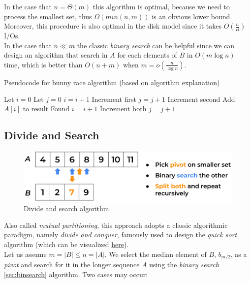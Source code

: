 In the case that $n=\Theta (m)$ this algorithm is optimal, because we need to process the smallest set, thus $\Omega(min(n,m))$ is an obvious lower bound. Moreover, this procedure is also optimal in the disk model since it takes $O \left(\frac{n}{B}\right)$ I/Os. \\
In the case that $n \ll m$ the classic \textit{binary search} can be helpful since we can design an algorithm that search in $A$ for each elements of $B$ in $O(m \log n)$ time, which is better than $O(n+m)$ when $m=o\left(\frac{n}{\log n}\right)$.

\begin{algorithm}
    \captionsetup{labelsep=newline}
    \caption{Pseudocode for bunny race algorithm \label{alg:bunnyrace} (based on algorithm explanation)}
    \begin{algorithmic}[1]
        \State Let $i=0$ 
        \State Let $j=0$ 
                \State $i=i+1$ \Comment Increment first
                \State $j=j+1$ \Comment Increment second
            \Else
                \State Add $A[i]$ to result \Comment Found
                \State $i=i+1$  \Comment Increment both
                \State $j=j+1$
            \EndIf
        \EndWhile
    \end{algorithmic}
\end{algorithm}

\subsection{Divide and Search \label{sec:divandsearch}}

\begin{figure}[H] 
    \begin{center}
        \includegraphics[width=.8\textwidth]{imgs/divide_and_search.png}
        \caption{Divide and search algorithm \label{fig:divandsearch}}
    \end{center}
\end{figure}

Also called \textit{mutual partitioning}, this approach adopts a classic algorithmic paradigm, namely \textit{divide and conquer}, famously used to design the \textit{quick sort} algorithm (which can be visualized \href{https://en.wikipedia.org/wiki/Quicksort}{here}).\\
Let us assume $m=|B| \leq n=|A|$. We select the median element of $B$, $b_{m/2}$, as a \textit{pivot} and search for it in the longer sequence $A$ using the \textit{binary search} \ref{sec:binsearch} algorithm.
Two cases may occur: 

